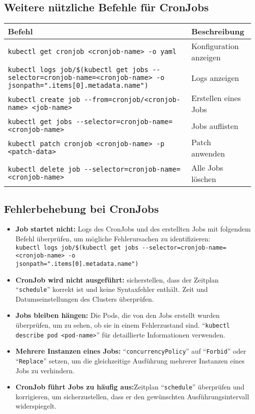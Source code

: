 \subsection{Weitere nützliche Befehle für CronJobs}
\begin{tabular}{|p{}|p{}|}
\hline
\textbf{Befehl} & \textbf{Beschreibung} \\
\hline
\texttt{kubectl get cronjob <cronjob-name> -o yaml} & Konfiguration anzeigen \\
\texttt{kubectl logs job/\$(kubectl get jobs {-}{-}selector=cronjob-name=<cronjob-name> -o jsonpath="{.items[0].metadata.name}")} & Logs anzeigen \\
\texttt{kubectl create job {-}{-}from=cronjob/<cronjob-name> <job-name>} & Erstellen eines Jobs \\
\texttt{kubectl get jobs {-}{-}selector=cronjob-name=<cronjob-name>} & Jobs auflisten \\
\texttt{kubectl patch cronjob <cronjob-name> -p <patch-data>} & Patch anwenden \\
\texttt{kubectl delete job {-}{-}selector=cronjob-name=<cronjob-name>} & Alle Jobs löschen \\
\hline
\end{tabular}

\subsection{Fehlerbehebung bei CronJobs}
\begin{itemize}
    \item \textbf{Job startet nicht:} Logs des CronJobs und des erstellten Jobs mit folgendem Befehl überprüfen, um mögliche Fehlerursachen zu identifizieren:\\
    \texttt{kubectl logs job/\$(kubectl get jobs {-}{-}selector=cronjob-name=<cronjob-name> -o\\jsonpath="{.items[0].metadata.name}")}
    \item \textbf{CronJob wird nicht ausgeführt:} sicherstellen, dass der Zeitplan \enquote{\texttt{schedule}} korrekt ist und keine Syntaxfehler enthält. Zeit und Datumseinstellungen des Clusters überprüfen.
    \item \textbf{Jobs bleiben hängen:} Die Pods, die von den Jobs erstellt wurden überprüfen, um zu sehen, ob sie in einem Fehlerzustand sind. \enquote{\texttt{kubectl describe pod <pod-name>}} für detaillierte Informationen verwenden.
    \item \textbf{Mehrere Instanzen eines Jobs:} \enquote{\texttt{concurrencyPolicy}} auf \enquote{\texttt{Forbid}} oder \enquote{\texttt{Replace}} setzen, um die gleichzeitige Ausführung mehrerer Instanzen eines Jobs zu verhindern.
    \item \textbf{CronJob führt Jobs zu häufig aus:}Zeitplan \enquote{\texttt{schedule}} überprüfen und korrigieren, um sicherzustellen, dass er den gewünschten Ausführungsintervall widerspiegelt.
\end{itemize}
\newpage
